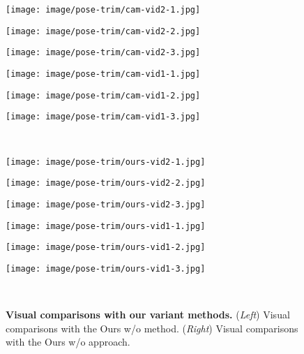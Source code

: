 \documentclass[times,referee,twocolumn,final,authoryear]{elsarticle}
\newcommand{\mpage}[2]
{
\begin{minipage}{#1\textwidth}\centering
#2
\end{minipage}
}
\begin{document}
\begin{figure*}[t]
  \begin{center}
  \mpage{0.01}{} \hfill
  \mpage{0.14}{\texttt{[image: image/pose-trim/cam-vid2-1.jpg]}} \hfill
  \mpage{0.14}{\texttt{[image: image/pose-trim/cam-vid2-2.jpg]}} \hfill
  \mpage{0.14}{\texttt{[image: image/pose-trim/cam-vid2-3.jpg]}} \hfill
  \hspace{2.0mm}
  \mpage{0.01}{} \hfill
  \mpage{0.14}{\texttt{[image: image/pose-trim/cam-vid1-1.jpg]}} \hfill
  \mpage{0.14}{\texttt{[image: image/pose-trim/cam-vid1-2.jpg]}} \hfill
  \mpage{0.14}{\texttt{[image: image/pose-trim/cam-vid1-3.jpg]}} \\
\vspace{1.5mm}
  \mpage{0.01}{} \hfill
  \mpage{0.14}{\texttt{[image: image/pose-trim/ours-vid2-1.jpg]}} \hfill
  \mpage{0.14}{\texttt{[image: image/pose-trim/ours-vid2-2.jpg]}} \hfill
  \mpage{0.14}{\texttt{[image: image/pose-trim/ours-vid2-3.jpg]}} \hfill
  \hspace{2.0mm}
  \mpage{0.01}{} \hfill
  \mpage{0.14}{\texttt{[image: image/pose-trim/ours-vid1-1.jpg]}} \hfill
  \mpage{0.14}{\texttt{[image: image/pose-trim/ours-vid1-2.jpg]}} \hfill
  \mpage{0.14}{\texttt{[image: image/pose-trim/ours-vid1-3.jpg]}} \\
\vspace{-1.5mm}
  \caption{
  \textbf{Visual comparisons with our variant methods.} 
(\emph{Left}) Visual comparisons with the Ours w/o  method.
(\emph{Right}) Visual comparisons with the Ours w/o  approach.
}
  \label{fig:ablation}
  \end{center}
  \vspace{-6.0mm}
\end{figure*}
\end{document}
